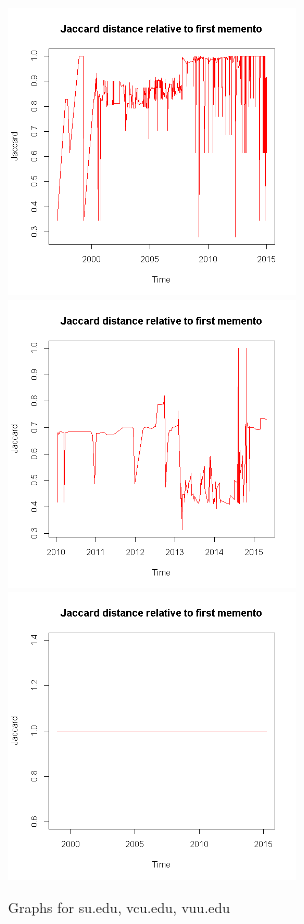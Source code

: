 \documentclass[12pt]{article} %
\begin{document}
\begin{figure}
\includegraphics[width=3in]{su-graph.png}
\includegraphics[width=3in]{vcu-graph.png}
\includegraphics[width=3in]{vuu-graph.png}
\caption{Graphs for su.edu, vcu.edu, vuu.edu}
\end{figure}












\end{document}
